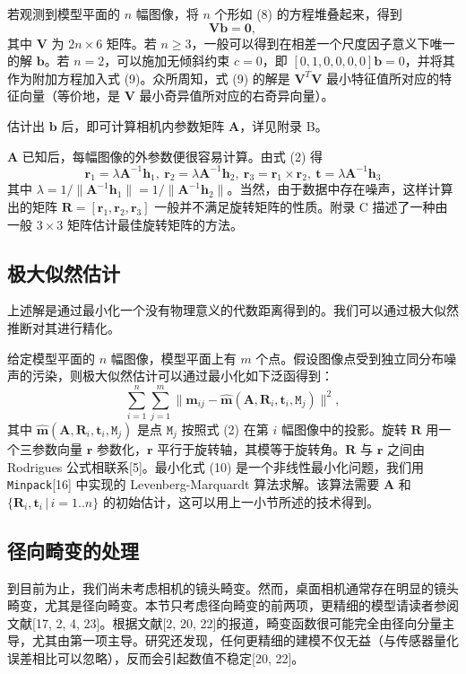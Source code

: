 \documentclass[a4paper,twocolumn,zihao=5,fontset=none,UTF8]{ctexart}
\newcommand{\A}{\mathbf{A}}
\newcommand{\R}{\mathbf{R}}
\newcommand{\h}{\mathbf{h}}
\newcommand{\rr}{\mathbf{r}}
\newcommand{\tv}{\mathbf{t}}
\newcommand{\bv}{\mathbf{b}}
\newcommand{\m}{\mathbf{m}}
\newcommand{\M}{\mathtt{M}}
\begin{document}
若观测到模型平面的 $n$ 幅图像，将 $n$ 个形如 (8) 的方程堆叠起来，得到
\begin{equation}
  \mathbf{V}\bv=\mathbf{0},
\end{equation}
其中 $\mathbf{V}$ 为 $2n\times6$ 矩阵。若 $n\ge3$，一般可以得到在相差一个尺度因子意义下唯一的解 $\bv$。若 $n=2$，可以施加无倾斜约束 $c=0$，即 $[0,1,0,0,0,0]\bv=0$，并将其作为附加方程加入式 (9)。众所周知，式 (9) 的解是 $\mathbf{V}^T\mathbf{V}$ 最小特征值所对应的特征向量（等价地，是 $\mathbf{V}$ 最小奇异值所对应的右奇异向量）。

估计出 $\bv$ 后，即可计算相机内参数矩阵 $\A$，详见附录 B。

$\A$ 已知后，每幅图像的外参数便很容易计算。由式 (2) 得
\begin{equation*}
  \rr_1=\lambda\A^{-1}\h_1,\ \rr_2=\lambda\A^{-1}\h_2,\ \rr_3=\rr_1\times\rr_2,\ \tv=\lambda\A^{-1}\h_3
\end{equation*}
其中 $\lambda=1/\|\A^{-1}\h_1\|=1/\|\A^{-1}\h_2\|$。当然，由于数据中存在噪声，这样计算出的矩阵 $\R=[\rr_1,\rr_2,\rr_3]$ 一般并不满足旋转矩阵的性质。附录 C 描述了一种由一般 $3\times3$ 矩阵估计最佳旋转矩阵的方法。

\subsection{极大似然估计}

上述解是通过最小化一个没有物理意义的代数距离得到的。我们可以通过极大似然推断对其进行精化。

给定模型平面的 $n$ 幅图像，模型平面上有 $m$ 个点。假设图像点受到独立同分布噪声的污染，则极大似然估计可以通过最小化如下泛函得到：
\begin{equation}
  \sum_{i=1}^{n}\sum_{j=1}^{m}\bigl\|\m_{ij}-\hat{\m}(\A,\R_i,\tv_i,\M_j)\bigr\|^2,
\end{equation}
其中 $\hat{\m}(\A,\R_i,\tv_i,\M_j)$ 是点 $\M_j$ 按照式 (2) 在第 $i$ 幅图像中的投影。旋转 $\R$ 用一个三参数向量 $\rr$ 参数化，$\rr$ 平行于旋转轴，其模等于旋转角。$\R$ 与 $\rr$ 之间由 Rodrigues 公式相联系[5]。最小化式 (10) 是一个非线性最小化问题，我们用 \texttt{Minpack}[16] 中实现的 Levenberg-Marquardt 算法求解。该算法需要 $\A$ 和 $\{\R_i,\tv_i\,|\,i=1..n\}$ 的初始估计，这可以用上一小节所述的技术得到。

\subsection{径向畸变的处理}

到目前为止，我们尚未考虑相机的镜头畸变。然而，桌面相机通常存在明显的镜头畸变，尤其是径向畸变。本节只考虑径向畸变的前两项，更精细的模型请读者参阅文献[17, 2, 4, 23]。根据文献[2, 20, 22]的报道，畸变函数很可能完全由径向分量主导，尤其由第一项主导。研究还发现，任何更精细的建模不仅无益（与传感器量化误差相比可以忽略），反而会引起数值不稳定[20, 22]。
\end{document}

